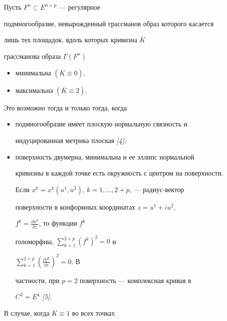 \begin{thm}


Пусть $F^{n}\subset E^{n+p}$ --- регулярное


подмногообразие, невырожденный грассманов образ которого касается


лишь тех площадок, вдоль которых кривизна $\overline K$


грассманова образа $\Gamma (F^{n})$


\begin{itemize}


\item[а)] минимальна $(\overline K \equiv 0)$,


\item[б)] максимальна $(\overline K \equiv 2)$.


\end{itemize}


Это возможно тогда и только тогда, когда


\begin{itemize}


\item[а)] подмногообразие имеет плоскую нормальную связность и


индуцированная метрика плоская {\em [4];}


\item[б)] поверхность двумерна, минимальна и ее эллипс нормальной


кривизны в каждой точке есть окружность с центром на поверхности.


Если $x^{k}=x^{k}(u^{1},u^{2})$, $k=1,\dotsc,2+p$, --- радиус-вектор


поверхности в конформных координатах $z=u^{1}+iu^{2}$,


$f^{k}=\frac{\partial x^{k}}{\partial z}$, то функции $f^{k}$


голоморфны, $\sum\limits_{k=1}^{2+p}(f^{k})^{2}=0$ и


$\sum\limits_{k=1}^{2+p}(\frac{\partial f^{k}}{\partial z})^{2}=0$. В


частности, при $p=2$ поверхность --- комплексная кривая в


$C^{2}=E^{4}$ {\em [5]}.


\end{itemize}


\end{thm}





В случае, когда $\overline K \equiv 1$ во всех точках


